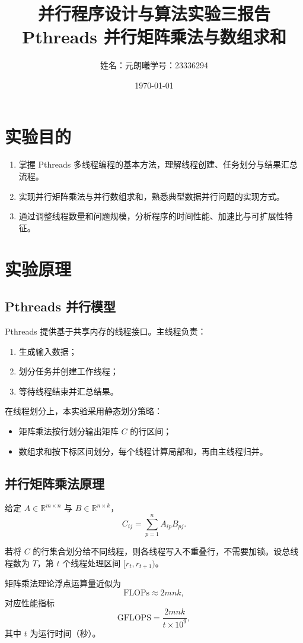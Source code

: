 \documentclass[12pt,a4paper]{ctexart}
\title{并行程序设计与算法实验三报告\\Pthreads 并行矩阵乘法与数组求和}
\author{姓名：元朗曦\quad 学号：23336294}
\date{\today}
\begin{document}
\maketitle

\section{实验目的}
\begin{enumerate}
    \item 掌握 Pthreads 多线程编程的基本方法，理解线程创建、任务划分与结果汇总流程。
    \item 实现并行矩阵乘法与并行数组求和，熟悉典型数据并行问题的实现方式。
    \item 通过调整线程数量和问题规模，分析程序的时间性能、加速比与可扩展性特征。
\end{enumerate}

\section{实验原理}
\subsection{Pthreads 并行模型}
Pthreads 提供基于共享内存的线程接口。主线程负责：
\begin{enumerate}
    \item 生成输入数据；
    \item 划分任务并创建工作线程；
    \item 等待线程结束并汇总结果。
\end{enumerate}

在线程划分上，本实验采用静态划分策略：
\begin{itemize}
    \item 矩阵乘法按行划分输出矩阵 $C$ 的行区间；
    \item 数组求和按下标区间划分，每个线程计算局部和，再由主线程归并。
\end{itemize}

\subsection{并行矩阵乘法原理}
给定 $A\in\mathbb{R}^{m\times n}$ 与 $B\in\mathbb{R}^{n\times k}$，
\[
C_{ij}=\sum_{p=1}^{n}A_{ip}B_{pj}.
\]

若将 $C$ 的行集合划分给不同线程，则各线程写入不重叠行，不需要加锁。设总线程数为 $T$，第 $t$ 个线程处理区间 $[r_t, r_{t+1})$。

矩阵乘法理论浮点运算量近似为
\[
\text{FLOPs} \approx 2mnk,
\]
对应性能指标
\[
\text{GFLOPS}=\frac{2mnk}{t\times 10^9},
\]
其中 $t$ 为运行时间（秒）。
\end{document}

